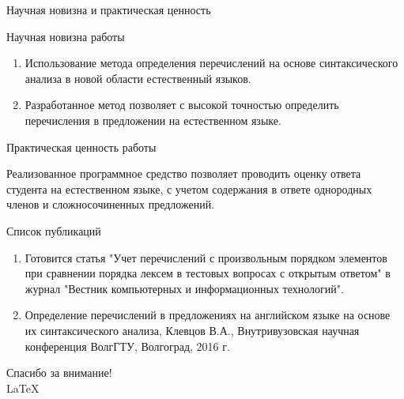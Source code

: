 \documentclass[10pt,ps,serif,mathserif]{beamer}
\begin{document}
    \begin{frame}{Научная новизна и практическая ценность}
        \begin{block} {Научная новизна работы} %
            \begin{enumerate}
                \item Использование метода определения перечислений на основе синтаксического анализа в новой области естественный языков.
                \item Разработанное метод позволяет с высокой точностью определить перечисления в предложении на естественном языке.
            \end{enumerate}
        \end{block}
        \begin{block}{Практическая ценность работы} %
            \par Реализованное программное средство позволяет проводить оценку ответа студента на естественном языке, с учетом содержания в ответе однородных членов и сложносочиненных предложений.
        \end{block}
    \end{frame}
    \begin{frame}{Список публикаций}
        \begin{enumerate}
            \item Готовится статья "Учет перечислений с произвольным порядком элементов при сравнении порядка лексем в тестовых вопросах с открытым ответом" в журнал "Вестник компьютерных и информационных технологий".
            \item Определение перечислений в предложениях на английском языке на основе их синтаксического анализа, Клевцов В.А., Внутривузовская научная конференция ВолгГТУ, Волгоград, 2016 г.
        \end{enumerate}
    \end{frame}
    \begin{frame}
        \begin{center}
            \Huge Спасибо за внимание!\\
            \LaTeX
        \end{center}
    \end{frame}
\end{document}
